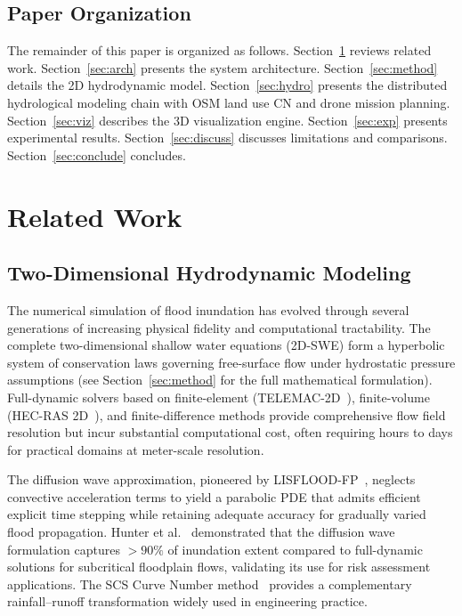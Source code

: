 \documentclass[11pt, a4paper]{article}
\begin{document}
\subsection{Paper Organization}

The remainder of this paper is organized as follows. Section~\ref{sec:related} reviews related work. Section~\ref{sec:arch} presents the system architecture. Section~\ref{sec:method} details the 2D hydrodynamic model. Section~\ref{sec:hydro} presents the distributed hydrological modeling chain with OSM land use CN and drone mission planning. Section~\ref{sec:viz} describes the 3D visualization engine. Section~\ref{sec:exp} presents experimental results. Section~\ref{sec:discuss} discusses limitations and comparisons. Section~\ref{sec:conclude} concludes.

\section{Related Work}
\label{sec:related}

\subsection{Two-Dimensional Hydrodynamic Modeling}

The numerical simulation of flood inundation has evolved through several generations of increasing physical fidelity and computational tractability. The complete two-dimensional shallow water equations (2D-SWE) form a hyperbolic system of conservation laws governing free-surface flow under hydrostatic pressure assumptions (see Section~\ref{sec:method} for the full mathematical formulation). Full-dynamic solvers based on finite-element (TELEMAC-2D~\cite{telemac}), finite-volume (HEC-RAS 2D~\cite{hecras}), and finite-difference methods provide comprehensive flow field resolution but incur substantial computational cost, often requiring hours to days for practical domains at meter-scale resolution.

The diffusion wave approximation, pioneered by LISFLOOD-FP~\cite{bates2010,neal2012}, neglects convective acceleration terms to yield a parabolic PDE that admits efficient explicit time stepping while retaining adequate accuracy for gradually varied flood propagation. Hunter et al.~\cite{hunter2007} demonstrated that the diffusion wave formulation captures $>90\%$ of inundation extent compared to full-dynamic solutions for subcritical floodplain flows, validating its use for risk assessment applications. The SCS Curve Number method~\cite{scs} provides a complementary rainfall--runoff transformation widely used in engineering practice.
\end{document}
